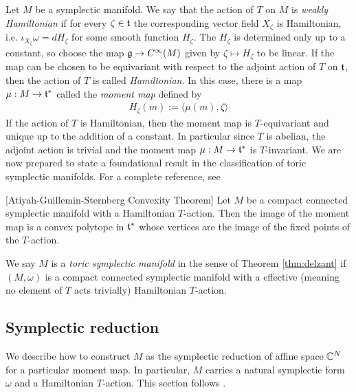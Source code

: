 Let $M$ be a symplectic manifold. We say that the action of $T$ on $M$ is \emph{weakly Hamiltonian} if for every $\zeta\in\mathfrak{t}$ the corresponding vector field $X_\zeta$ is Hamiltonian,
i.e. $\iota_{X_\zeta}\omega = dH_\zeta$ for some smooth function $H_\zeta$. The $H_\zeta$
is determined only up to a constant, so choose the map $\mathfrak{g} \to C^\infty(M)$ given by 
$\zeta \mapsto H_\zeta$ to be linear. If the map can be chosen to be equivariant with respect
to the adjoint action of $T$ on $\mathfrak{t}$, then the action of $T$ is called \emph{Hamiltonian}.
In this case, there is a map $\mu : M \to \mathfrak{t}^*$ called the \emph{moment map} defined by
\begin{align*}
    H_\zeta(m) := \langle \mu(m), \zeta \rangle
\end{align*}
If the action of $T$ is Hamiltonian, then the moment map is $T$-equivariant and unique up 
to the addition of a constant. In particular since $T$ is abelian, the adjoint action 
is trivial and the moment map $\mu : M \to \mathfrak{t}^*$ is $T$-invariant. We are now prepared to state a foundational result in the classification of toric symplectic manifolds. For a 
complete reference, see \cite{mcduff-salamon}
\begin{theorem}\label{thm:ags}
    [Atiyah-Guillemin-Sternberg Convexity Theorem] Let $M$ be a compact connected symplectic manifold with a
    Hamiltonian $T$-action. Then the image of the moment map is a convex polytope 
    in $\mathfrak{t}^*$ whose vertices are the image of the fixed points of the $T$-action.
\end{theorem}
We say $M$ is a \emph{toric symplectic manifold} in the sense of Theorem \ref{thm:delzant}
if $(M,\omega)$ is a compact connected symplectic manifold
with a effective (meaning no element of $T$ acts trivially) Hamiltonian $T$-action.


\subsection{Symplectic reduction}
We describe how to construct $M$ as the symplectic reduction of affine space $\mathbb{C}^N$ for 
a particular moment map. In particular, $M$ carries a natural symplectic form $\omega$ and 
a Hamiltonian $T$-action.
This section follows \cite{lsg}. 

